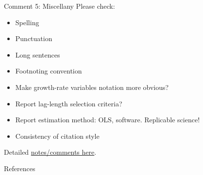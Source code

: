 \documentclass[10pt,english,slidetop,compress,
              blue,mathserif,color=option]{beamer}
\def\linkcomment{https://anu365-my.sharepoint.com/:b:/g/personal/u4166777_anu_edu_au/EeK_K1JK5xBEhnuH1ve4scQBebERBDPgNxMcK7s1sHJjUw?e=L9FW6m}
\theoremstyle{plain}
\theoremstyle{definition}
\begin{document}
\begin{frame}{Comment 5: Miscellany}
  Please check:
  \begin{itemize}
    \item Spelling
    \item Punctuation
    \item Long sentences
    \item Footnoting convention
    \item Make growth-rate variables notation more obvious?
    \item Report lag-length selection criteria?
    \item Report estimation method: OLS, software. Replicable science!
    \item Consistency of citation style
  \end{itemize}

  Detailed \href{\linkcomment}{notes/comments here}.
\end{frame}



\begin{frame}{References}
  \begin{smaller}
    \printbibliography
  \end{smaller}
\end{frame}
\end{document}

